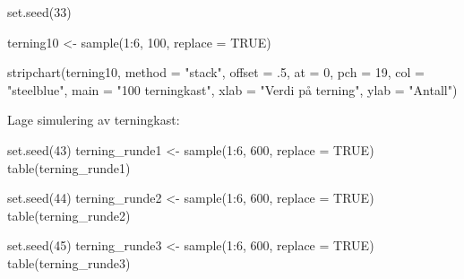 \documentclass[
]{book}
\newenvironment{Shaded}{\begin{snugshade}}{\end{snugshade}}
\newcommand{\AttributeTok}[1]{\textcolor[rgb]{0.77,0.63,0.00}{#1}}
\newcommand{\ConstantTok}[1]{\textcolor[rgb]{0.00,0.00,0.00}{#1}}
\newcommand{\DecValTok}[1]{\textcolor[rgb]{0.00,0.00,0.81}{#1}}
\newcommand{\FunctionTok}[1]{\textcolor[rgb]{0.00,0.00,0.00}{#1}}
\newcommand{\NormalTok}[1]{#1}
\newcommand{\OtherTok}[1]{\textcolor[rgb]{0.56,0.35,0.01}{#1}}
\newcommand{\SpecialCharTok}[1]{\textcolor[rgb]{0.00,0.00,0.00}{#1}}
\newcommand{\StringTok}[1]{\textcolor[rgb]{0.31,0.60,0.02}{#1}}
\begin{document}
\begin{Shaded}
\begin{Highlighting}[]
\FunctionTok{set.seed}\NormalTok{(}\DecValTok{33}\NormalTok{)}

\NormalTok{terning10 }\OtherTok{\textless{}{-}} \FunctionTok{sample}\NormalTok{(}\DecValTok{1}\SpecialCharTok{:}\DecValTok{6}\NormalTok{, }\DecValTok{100}\NormalTok{, }\AttributeTok{replace =} \ConstantTok{TRUE}\NormalTok{)}

\FunctionTok{stripchart}\NormalTok{(terning10, }\AttributeTok{method =} \StringTok{"stack"}\NormalTok{, }\AttributeTok{offset =}\NormalTok{ .}\DecValTok{5}\NormalTok{, }\AttributeTok{at =} \DecValTok{0}\NormalTok{, }\AttributeTok{pch =} \DecValTok{19}\NormalTok{,}
           \AttributeTok{col =} \StringTok{"steelblue"}\NormalTok{, }\AttributeTok{main =} \StringTok{"100 terningkast"}\NormalTok{, }\AttributeTok{xlab =} \StringTok{"Verdi på terning"}\NormalTok{, }\AttributeTok{ylab =} \StringTok{"Antall"}\NormalTok{)}
\end{Highlighting}
\end{Shaded}

Lage simulering av terningkast:

\begin{Shaded}
\begin{Highlighting}[]
\FunctionTok{set.seed}\NormalTok{(}\DecValTok{43}\NormalTok{)}
\NormalTok{terning\_runde1 }\OtherTok{\textless{}{-}} \FunctionTok{sample}\NormalTok{(}\DecValTok{1}\SpecialCharTok{:}\DecValTok{6}\NormalTok{, }\DecValTok{600}\NormalTok{, }\AttributeTok{replace =} \ConstantTok{TRUE}\NormalTok{)}
\FunctionTok{table}\NormalTok{(terning\_runde1)}

\FunctionTok{set.seed}\NormalTok{(}\DecValTok{44}\NormalTok{)}
\NormalTok{terning\_runde2 }\OtherTok{\textless{}{-}} \FunctionTok{sample}\NormalTok{(}\DecValTok{1}\SpecialCharTok{:}\DecValTok{6}\NormalTok{, }\DecValTok{600}\NormalTok{, }\AttributeTok{replace =} \ConstantTok{TRUE}\NormalTok{)}
\FunctionTok{table}\NormalTok{(terning\_runde2)}

\FunctionTok{set.seed}\NormalTok{(}\DecValTok{45}\NormalTok{)}
\NormalTok{terning\_runde3 }\OtherTok{\textless{}{-}} \FunctionTok{sample}\NormalTok{(}\DecValTok{1}\SpecialCharTok{:}\DecValTok{6}\NormalTok{, }\DecValTok{600}\NormalTok{, }\AttributeTok{replace =} \ConstantTok{TRUE}\NormalTok{)}
\FunctionTok{table}\NormalTok{(terning\_runde3)}
\end{Highlighting}
\end{Shaded}
\end{document}
